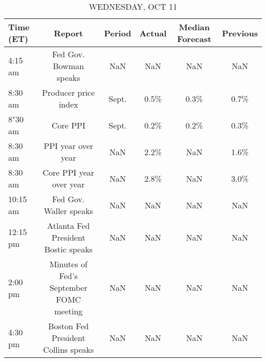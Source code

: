 \documentclass{article}%
\begin{document}
\begin{table}[htbp]%
\caption{WEDNESDAY, OCT 11}%
\centering%
\begin{adjustbox}{width=1\textwidth}%
\begin{tabular}{lccccc}
\toprule
Time (ET) &                                  Report & Period & Actual & Median Forecast & Previous \\
\midrule
  4:15 am &                  Fed Gov. Bowman speaks &    NaN &    NaN &             NaN &      NaN \\
  8:30 am &                    Producer price index &  Sept. &   0.5\% &            0.3\% &     0.7\% \\
  8"30 am &                                Core PPI &  Sept. &   0.2\% &            0.2\% &     0.3\% \\
  8:30 am &                      PPI year over year &    NaN &   2.2\% &             NaN &     1.6\% \\
  8:30 am &                 Core PPI year over year &    NaN &   2.8\% &             NaN &     3.0\% \\
 10:15 am &                  Fed Gov. Waller speaks &    NaN &    NaN &             NaN &      NaN \\
 12:15 pm &     Atlanta Fed President Bostic speaks &    NaN &    NaN &             NaN &      NaN \\
  2:00 pm & Minutes of Fed's September FOMC meeting &    NaN &    NaN &             NaN &      NaN \\
  4:30 pm &     Boston Fed President Collins speaks &    NaN &    NaN &             NaN &      NaN \\
\bottomrule
\end{tabular}
%
\end{adjustbox}%
\end{table}

%
\end{document}
